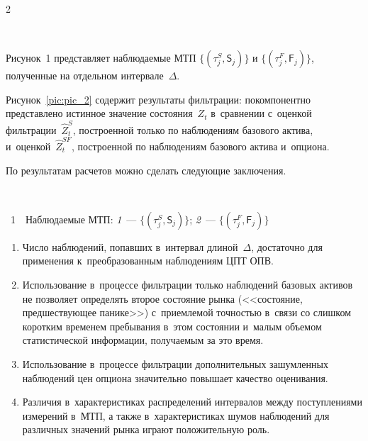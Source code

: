\begin{multicols}{2}
\setcounter{figure}{1}
\begin{figure*}[b] %
\vspace*{1pt}
      \begin{center}
     \mbox{%
\epsfxsize=163mm 
}
\end{center}
\vspace*{-9pt}
\label{pic:pic_2}
\end{figure*}

Рисунок~1 представляет наблюдаемые МТП $\{(\tau_j^S, \mathsf{S}_j)\}$ 
и
$\{(\tau_j^F, \mathsf{F}_j)\}$, полученные на отдельном интервале~$\Delta$. 



Рисунок~\ref{pic:pic_2} содержит результаты фильтрации: покомпонентно представлено 
истинное значение состояния~$Z_t$ в~сравнении с~оценкой фильтрации~$\widehat{Z}_t^{S}$, 
построенной только по наблюдениям базового актива, и~оценкой~$\widehat{Z}_t^{SF}$, построенной по наблюдениям базового актива 
и~опциона.



По результатам расчетов можно сделать сле\-ду\-ющие заключения.

\pagebreak

{ \begin{center}  %
 \vspace*{-6pt}
  \mbox{%
\epsfxsize=79mm 
}

\end{center}

\noindent
{{\figurename~1}\ \ \small{Наблюдаемые МТП: \textit{1}~--- $\{(\tau_j^S, \mathsf{S}_j)\}$;
\textit{2}~--- $\{(\tau_j^F, \mathsf{F}_j)\}$
}}}

\vspace*{6pt}




\noindent
\begin{enumerate}
\item
 Число наблюдений, попавших в~интервал длиной~$\Delta$, достаточно для 
применения к~преобразованным наблюдениям ЦПТ ОПВ.
\item
Использование в~процессе фильтрации только наблюдений базовых активов не 
позволяет определять второе состояние рынка (<<состояние, предшествующее 
панике>>) с~приемлемой точностью в~связи со слишком коротким временем пребывания в~этом состоянии и~малым объемом статистической информации, получаемым за это 
время.
\item
Использование в~процессе фильтрации дополнительных зашумленных наблюдений цен 
опциона значительно повышает качество оценивания.
\item
Различия в~характеристиках распределений интервалов между поступлениями 
измерений в~МТП, а также в~характеристиках шумов наблюдений для различных 
значений рынка играют положительную роль.
\end{enumerate}


\end{multicols}
